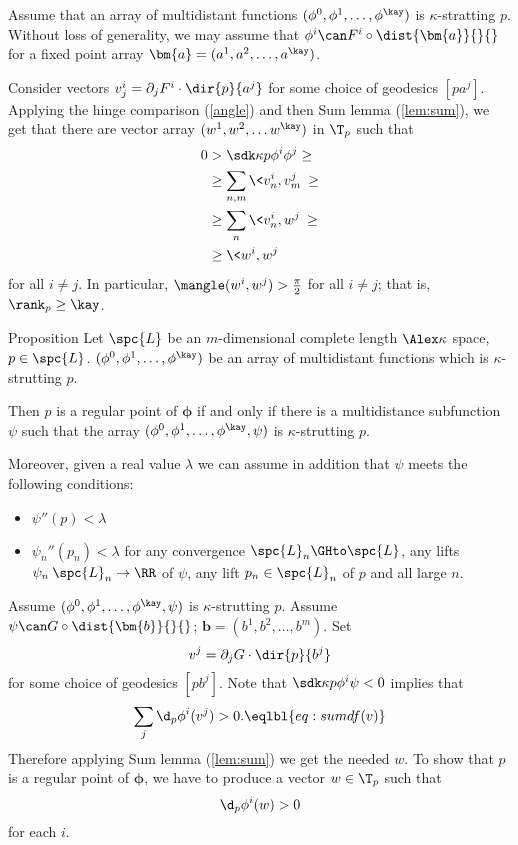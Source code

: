 Assume that 
an array of multidistant functions $(\phi^0,\phi^1,\dots,\phi^\kay)$ is $\kappa$-stratting $p$.
Without loss of generality, we may assume that 
$\phi^i\can F^i\circ\dist{\bm{a}}{}{}$ for a fixed point array $\bm{a}=(a^1,a^2,\dots,a^\kay)$.

Consider vectors $v^i_j=\partial_jF^i\cdot\dir{p}{a^j}$ for some choice of geodesics $[pa^j]$.
Applying the hinge comparison (\ref{angle})
and then Sum lemma (\ref{lem:sum}), 
we get that there are vector array 
$(w^1,w^2,\dots w^\kay)$  in $\T_p$
such that 
\begin{align*}
0&>\sdk\kappa{p}{\phi^i}{\phi^j}
\ge
\\
&\ge\sum_{n,m}\<v^i_n,v^j_m\>\ge
\\
&\ge\sum_n\<v^i_n,w^j\>\ge
\\
&\ge\<w^i,w^j\>
\end{align*}
for all $i\ne j$.
In particular, $\mangle(w^i,w^j)>\tfrac\pi2$ for all $i\ne j$;
that is, $\rank_p\ge \kay$.
\qeds



\begin{thm}{Proposition}\label{prop:regular=+1}
Let $\spc{L}$ be an $m$-dimensional complete length $\Alex\kappa$ space, 
$p\in  \spc{L}$.
$(\phi^0,\phi^1,\dots,\phi^\kay)$
be an array of multidistant functions which is $\kappa$-strutting $p$.

Then $p$ is a regular point of $\bm{\phi}$ if and only if there is a multidistance subfunction $\psi$ such that 
the array 
$(\phi^0,\phi^1,\dots,\phi^\kay,\psi)$ 
is $\kappa$-strutting $p$.

Moreover, given a real value $\lambda$
we can assume in addition that $\psi$ meets the following conditions:
\begin{itemize}
\item $\psi''(p)< \lambda$
\item $\psi_n''(p_n)< \lambda$ for 
any convergence $\spc{L}_n\GHto\spc{L}$,
any lifts $\psi_n\:\spc{L}_n\to\RR$ of $\psi$,
any lift $p_n\in \spc{L}_n$ of $p$
and all large $n$.
\end{itemize}
\end{thm}



Assume $(\phi^0,\phi^1,\dots,\phi^\kay,\psi)$ is $\kappa$-strutting $p$.
Assume $\psi\can G\circ\dist{\bm{b}}{}{}$;
$\bm{b}=(b^1,b^2,\dots,b^m)$.
Set 
\[v^j=\partial_jG\cdot \dir{p}{b^j}\] 
for some choice of geodesics $[p b^j]$.
Note that $\sdk\kappa p{\phi^i}\psi<0$ implies that
\[\sum_j\d_p\phi^i(v^j)>0.
\eqlbl{eq:sum df(v)}
\]
Therefore applying Sum lemma (\ref{lem:sum})
we get the needed $w$.
 To show that $p$ is a regular point of $\bm{\phi}$,
we have to produce a vector $w\in\T_p$ such that 
\[\d_p\phi^i(w)>0\] 
for each $i$.

